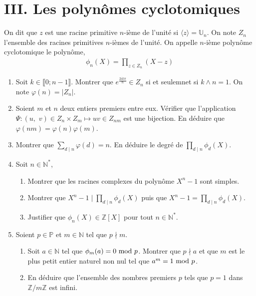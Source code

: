 \documentclass{article}
\begin{document}
	\section{III. Les polynômes cyclotomiques}
	On dit que $z$ est une racine primitive $n$-ième de l'unité si $\langle z\rangle = \mathbb{U}_n$. On note $Z_n$ l'ensemble des racines primitives $n$-ièmes de l'unité. On appelle $n$-ième polynôme cyclotomique le polynôme,
	\begin{align*}
		\phi_n(X) = \prod_{z\in Z_n}(X-z)
	\end{align*}
	\begin{enumerate}
		\item Soit $k\in\llbracket 0;n-1\rrbracket$. Montrer que $e^{\frac{2ik\pi}{n}}\in Z_n$ si et seulemnet si $k\wedge n = 1$. On note $\varphi(n) =|Z_n|$.
		\item Soient $m$ et $n$ deux entiers premiers entre eux. Vérifier que l'application $\Psi : (u,\,\, v) \in Z_n\times Z_m\mapsto uv \in Z_{nm}$ est une bijection. En déduire que $\varphi(nm) = \varphi(n)\varphi(m)$.
		\item Montrer que $\sum_{d\mid n}\varphi(d) = n$. En déduire le degré de $\prod_{d\mid n}\phi_d(X)$.
	\item Soit $n\in\mathbb{N}^*$, \begin{enumerate}\item Montrer que les racines complexes du polynôme $X^n-1$ sont simples.
		\item Montrer que $X^{n}-1\mid \prod_{d\mid n}\phi_d(X)$ puis que $X^n-1 = \prod_{d\mid n}\phi_d(X)$.
		\item Justifier que $\phi_n(X)\in \mathbb{Z}[X]$ pour tout $n\in\mathbb{N}^*$.
	\end{enumerate}
\item Soient $p\in\mathbb{P}$ et $m\in\mathbb{N}$ tel que $p\nmid m$.
	\begin{enumerate}
		\item Soit $a\in\mathbb{N}$ tel que $\phi_m(a) = 0 \textup{ mod } p$. Montrer que $p\nmid a$ et que $m$ est le plus petit entier naturel non nul tel que $a^m = 1 \textup{ mod } p$.
		\item En déduire que l'ensemble des nombres premiers $p$ tels que $p = 1$ dans $\mathbb{Z}/{m\mathbb{Z}}$ est infini.
	\end{enumerate}\end{enumerate}
	
\end{document}
